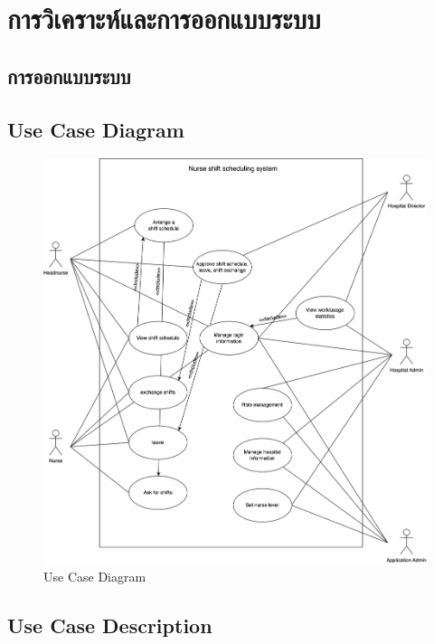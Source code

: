 \baselineskip=8mm
\chapter{การวิเคราะห์และการออกแบบระบบ}

\renewcommand{\thesubsection}{\arabic{subsection}.}
\renewcommand{\theequation}{\thesection.\arabic{equation}}
\renewcommand{\thesection}{}


\section{การออกแบบระบบ}


\section{Use Case Diagram}
\begin{figure}
    \centering
    \includegraphics[width=1\textwidth]{UseCase.png}
    \caption{Use Case Diagram}
    \label{fig:usecase}
\end{figure}
\clearpage


\section{Use Case Description}

